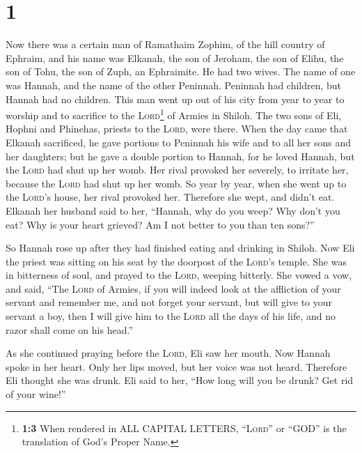 \hypertarget{section}{%
\section{1}\label{section}}

 Now there was a certain man of Ramathaim Zophim, of the
hill country of Ephraim, and his name was Elkanah, the son of Jeroham,
the son of Elihu, the son of Tohu, the son of Zuph, an Ephraimite.
 He had two wives. The name of one was Hannah, and the
name of the other Peninnah. Peninnah had children, but Hannah had no
children.  This man went up out of his city from year to
year to worship and to sacrifice to the \textsc{Lord}\footnote{\textbf{1:3}
  When rendered in ALL CAPITAL LETTERS, ``\textsc{Lord}'' or ``GOD'' is
  the translation of God's Proper Name.} of Armies in Shiloh. The two
sons of Eli, Hophni and Phinehas, priests to the \textsc{Lord}, were
there.  When the day came that Elkanah sacrificed, he gave
portions to Peninnah his wife and to all her sons and her daughters;
 but he gave a double portion to Hannah, for he loved
Hannah, but the \textsc{Lord} had shut up her womb.  Her
rival provoked her severely, to irritate her, because the \textsc{Lord}
had shut up her womb.  So year by year, when she went up
to the \textsc{Lord}'s house, her rival provoked her. Therefore she
wept, and didn't eat.  Elkanah her husband said to her,
``Hannah, why do you weep? Why don't you eat? Why is your heart grieved?
Am I not better to you than ten sons?''

 So Hannah rose up after they had finished eating and
drinking in Shiloh. Now Eli the priest was sitting on his seat by the
doorpost of the \textsc{Lord}'s temple.  She was in
bitterness of soul, and prayed to the \textsc{Lord}, weeping bitterly.
 She vowed a vow, and said, ``The \textsc{Lord} of
Armies, if you will indeed look at the affliction of your servant and
remember me, and not forget your servant, but will give to your servant
a boy, then I will give him to the \textsc{Lord} all the days of his
life, and no razor shall come on his head.''

 As she continued praying before the \textsc{Lord}, Eli
saw her mouth.  Now Hannah spoke in her heart. Only her
lips moved, but her voice was not heard. Therefore Eli thought she was
drunk.  Eli said to her, ``How long will you be drunk?
Get rid of your wine!''

